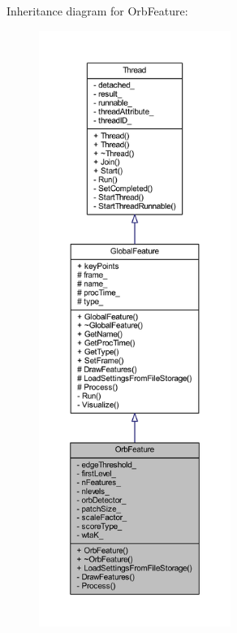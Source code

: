 Inheritance diagram for Orb\-Feature\-:
\nopagebreak
\begin{figure}[H]
\begin{center}
\leavevmode
\includegraphics[height=550pt]{class_orb_feature__inherit__graph}
\end{center}
\end{figure}


